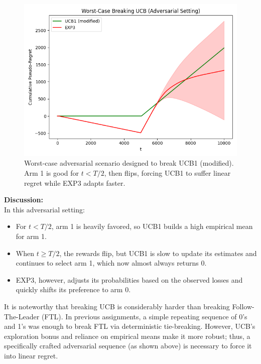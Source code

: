 \begin{figure}[H]
    \centering
    \includegraphics[width=1\textwidth]{Code/break_experiment_worst_case.png}
    \caption{Worst-case adversarial scenario designed to break UCB1 (modified). Arm 1 is good for $t < T/2$, then flips, forcing UCB1 to suffer linear regret while EXP3 adapts faster.}
\end{figure}

\bigskip
\textbf{Discussion:} \\
In this adversarial setting:
\begin{itemize}
    \item For $t < T/2$, arm 1 is heavily favored, so UCB1 builds a high empirical mean for arm 1.
    \item When $t \ge T/2$, the rewards flip, but UCB1 is slow to update its estimates and continues to select arm 1, which now almost always returns 0.
    \item EXP3, however, adjusts its probabilities based on the observed losses and quickly shifts its preference to arm 0.
\end{itemize}

It is noteworthy that breaking UCB is considerably harder than breaking Follow-The-Leader (FTL). In previous assignments, a simple repeating sequence of 0's and 1's was enough to break FTL via deterministic tie-breaking. However, UCB's exploration bonus and reliance on empirical means make it more robust; thus, a specifically crafted adversarial sequence (as shown above) is necessary to force it into linear regret.